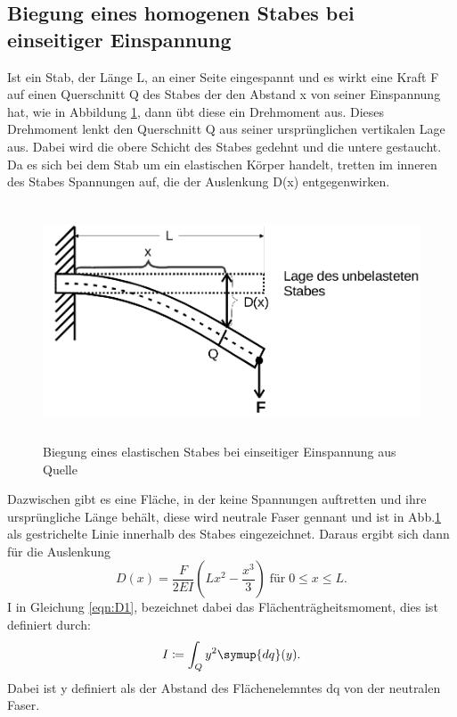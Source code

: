 \subsection{Biegung eines homogenen Stabes bei einseitiger Einspannung}
\label{sec:T1}
Ist ein Stab, der Länge L, an einer Seite eingespannt und es wirkt eine Kraft F
auf einen
Querschnitt Q des Stabes der den Abstand x von seiner Einspannung hat, wie in
Abbildung \ref{fig:abb2}, dann übt diese ein Drehmoment aus. Dieses Drehmoment
lenkt den Querschnitt Q aus seiner ursprünglichen vertikalen Lage aus. Dabei
wird die obere Schicht des Stabes gedehnt und die untere gestaucht. Da es sich
bei dem Stab um ein elastischen Körper handelt, tretten im inneren des Stabes
Spannungen auf, die der Auslenkung D(x) entgegenwirken.
\begin{figure}
  \centering
  \includegraphics[height = 7cm]{logos/Abb2.png}
  \caption{Biegung eines elastischen Stabes bei einseitiger Einspannung
  aus Quelle \cite{Anleitung}}
  \label{fig:abb2}
\end{figure}
\FloatBarrier
Dazwischen gibt es eine Fläche, in der keine Spannungen auftretten und ihre
ursprüngliche Länge behält, diese wird neutrale Faser gennant und ist in
Abb.\ref{fig:abb2} als gestrichelte Linie innerhalb des Stabes eingezeichnet.
Daraus ergibt sich dann für die Auslenkung
\begin{equation}
  D(x) = \frac{F}{2EI} \left(Lx^2-
  \frac{x^3}{3}\right) \; \text{für} \; 0 \leq x \leq L.
  \label{eqn:D1}
\end{equation}
I in Gleichung \eqref{eqn:D1}, bezeichnet dabei das Flächenträgheitsmoment, dies
ist definiert durch:
\begin{equation}
  I \coloneq \int_{Q}{y}^2\symup{dq}(y).
  \label{eqn:I}
\end{equation}
Dabei ist y definiert als der Abstand des Flächenelemntes dq von der neutralen
Faser.
